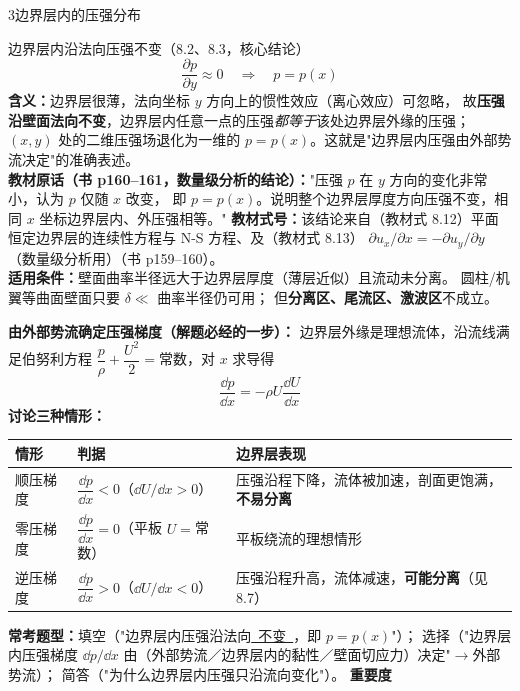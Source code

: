 \begin{kaodian}{3}{边界层内的压强分布}
\begin{gongshi}{边界层内沿法向压强不变（8.2、8.3，核心结论）}
\[ \frac{\partial p}{\partial y}\approx0\quad\Longrightarrow\quad p=p(x) \]
\textbf{含义：}边界层很薄，法向坐标 $y$ 方向上的惯性效应（离心效应）可忽略，
故\textbf{压强沿壁面法向不变}，边界层内任意一点的压强\emph{都等于}该处边界层外缘的压强；
$(x,y)$ 处的二维压强场退化为一维的 $p=p(x)$。这就是"边界层内压强由外部势流决定"的准确表述。\\
\textbf{教材原话（书 p160--161，数量级分析的结论）：}"压强 $p$ 在 $y$ 方向的变化非常小，认为 $p$ 仅随 $x$ 改变，
即 $p=p(x)$。说明整个边界层厚度方向压强不变，相同 $x$ 坐标边界层内、外压强相等。"
\textbf{教材式号：}该结论来自（教材式 8.12）平面恒定边界层的连续性方程与 N-S 方程、及（教材式 8.13）
$\partial u_x/\partial x=-\partial u_y/\partial y$（数量级分析用）（书 p159--160）。\\
\textbf{适用条件：}壁面曲率半径远大于边界层厚度（薄层近似）且流动未分离。
圆柱/机翼等曲面壁面只要 $\delta\ll$ 曲率半径仍可用；
但\textbf{分离区、尾流区、激波区}不成立。
\end{gongshi}

\textbf{由外部势流确定压强梯度（解题必经的一步）：}
边界层外缘是理想流体，沿流线满足伯努利方程 $\dfrac{p}{\rho}+\dfrac{U^2}{2}=$常数，对 $x$ 求导得
\[ \frac{\dd p}{\dd x}=-\rho U\frac{\dd U}{\dd x} \]
\textbf{讨论三种情形：}
\begin{center}
\begin{tabularx}{\textwidth}{@{}lXX@{}}
\toprule
情形 & 判据 & 边界层表现 \\
\midrule
顺压梯度 & $\dfrac{\dd p}{\dd x}<0$（$\dd U/\dd x>0$） & 压强沿程下降，流体被加速，剖面更饱满，\textbf{不易分离} \\
零压梯度 & $\dfrac{\dd p}{\dd x}=0$（平板 $U=$常数） & 平板绕流的理想情形 \\
逆压梯度 & $\dfrac{\dd p}{\dd x}>0$（$\dd U/\dd x<0$） & 压强沿程升高，流体减速，\textbf{可能分离}（见 8.7） \\
\bottomrule
\end{tabularx}
\end{center}

\textbf{常考题型：}填空（"边界层内压强沿法向\underline{\ 不变\ }，即 $p=p(x)$"）；
选择（"边界层内压强梯度 $\dd p/\dd x$ 由（外部势流／边界层内的黏性／壁面切应力）决定"$\to$外部势流）；
简答（"为什么边界层内压强只沿流向变化"）。
\textbf{重要度 }\quad{}


\end{kaodian}
